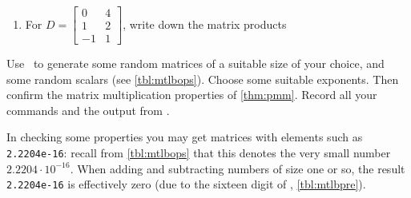 \begin{exercise}
\begin{enumerate}
\item For \(D=\begin{bmatrix} 0&4
\\1&2
\\-1&1 \end{bmatrix}\), write down the matrix products

\end{enumerate}
\end{exercise}






\begin{exercise} \label{ex:} 
Use \script\ to generate some random matrices of a suitable size of your choice, and some random scalars (see \autoref{tbl:mtlbops}).
Choose some suitable exponents.
Then confirm the matrix multiplication properties of \autoref{thm:pmm}.
Record all your commands and the output from \script.

In checking some properties you may get matrices with elements such as \verb|2.2204e-16|: recall from \autoref{tbl:mtlbops} that this denotes the very small number \(2.2204\cdot10^{-16}\). 
When adding and subtracting numbers of size one or so, the result \verb|2.2204e-16| is effectively zero (due to the sixteen digit  of \script, \autoref{tbl:mtlbpre}).
\end{exercise}

